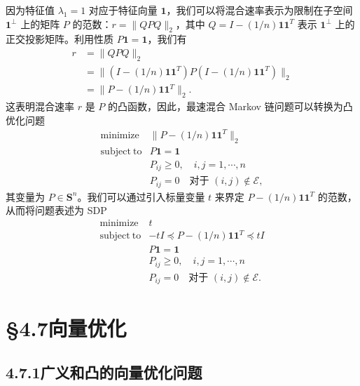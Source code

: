 \documentclass[UTF8,12pt,a4paper,fontset=fandol]{ctexart}
\begin{document}
因为特征值 $\lambda_1=1$ 对应于特征向量 $\mathbf{1}$，我们可以将混合速率表示为限制在子空间 $\mathbf{1}^{\perp}$ 上的矩阵 $P$ 的范数：$r=\|QPQ\|_2$，其中 $Q=I-(1/n)\mathbf{1}\mathbf{1}^T$ 表示 $\mathbf{1}^{\perp}$ 上的正交投影矩阵。利用性质 $P\mathbf{1}=\mathbf{1}$，我们有
\[
\begin{array}{rl}
r&=\|QPQ\|_2\\
&=\|(I-(1/n)\mathbf{1}\mathbf{1}^T)P(I-(1/n)\mathbf{1}\mathbf{1}^T)\|_2\\
&=\|P-(1/n)\mathbf{1}\mathbf{1}^T\|_2.
\end{array}
\]
这表明混合速率 $r$ 是 $P$ 的凸函数，因此，最速混合 Markov 链问题可以转换为凸优化问题
\[
\begin{array}{ll}
\mathop{\mathrm{minimize}} & \|P-(1/n)\mathbf{1}\mathbf{1}^T\|_2\\
\mathrm{subject\ to} & P\mathbf{1}=\mathbf{1}\\
& P_{ij}\geq 0,\quad i,j=1,\cdots,n\\
& P_{ij}=0\quad \text{对于 }(i,j)\notin\mathcal{E},
\end{array}
\]
其变量为 $P\in\mathbf{S}^n$。我们可以通过引入标量变量 $t$ 来界定 $P-(1/n)\mathbf{1}\mathbf{1}^T$ 的范数，从而将问题表述为 SDP
\begin{equation}
\begin{array}{ll}
\mathop{\mathrm{minimize}} & t\\
\mathrm{subject\ to} & -tI\preceq P-(1/n)\mathbf{1}\mathbf{1}^T\preceq tI\\
& P\mathbf{1}=\mathbf{1}\\
& P_{ij}\geq 0,\quad i,j=1,\cdots,n\\
& P_{ij}=0\quad \text{对于 }(i,j)\notin\mathcal{E}.
\end{array}
\tag{4.55}
\end{equation}

\section*{§4.7\quad 向量优化}

\subsection*{4.7.1\quad 广义和凸的向量优化问题}
\end{document}
